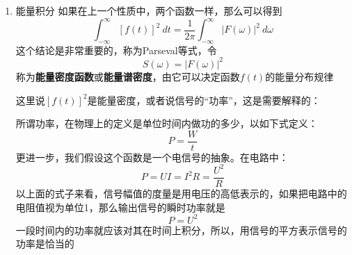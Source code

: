 \documentclass[UTF8]{ctexbook}
\begin{document}
\begin{enumerate}
				\item{能量积分}
					如果在上一个性质中，两个函数一样，那么可以得到
					\begin{equation}
						\int_{-\infty}^{\infty}[f(t)]^2\ dt=\dfrac{1}{2\pi}\int_{-\infty}^{\infty}|F(\omega)|^2\ d\omega
					\end{equation}
					这个结论是非常重要的，称为Parseval等式，令
					\begin{equation}
						S(\omega)=|F(\omega)|^2
					\end{equation}
					称为\textbf{能量密度函数}或\textbf{能量谱密度}，由它可以决定函数$f(t)$的能量分布规律
		
					这里说$[f(t)]^2$是能量密度，或者说信号的“功率”，这是需要解释的：
					
					所谓功率，在物理上的定义是单位时间内做功的多少，以如下式定义：
					\begin{equation}
					P = \dfrac{W}{t}
					\end{equation}
					更进一步，我们假设这个函数是一个电信号的抽象。在电路中：
					\begin{equation}
					P = UI = I^2R = \dfrac{U^2}{R}
					\end{equation}
					以上面的式子来看，信号幅值的度量是用电压的高低表示的，如果把电路中的电阻值视为单位1，那么输出信号的瞬时功率就是
					\begin{equation}
					P = U^2
					\end{equation}
					一段时间内的功率就应该对其在时间上积分，所以，用信号的平方表示信号的功率是恰当的
			\end{enumerate}
\end{document}
